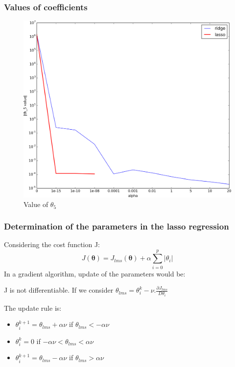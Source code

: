 \documentclass[handout, 10pt]{beamer}
\begin{document}
\begin{frame}
\frametitle{Values of coefficients}
\vspace{-2em}
\begin{table}
\resizebox{\textwidth}{!}{%
}
\end{table}
\begin{figure}
\includegraphics[height=0.4\textheight]{./coefs_th5_lasso.png}\\
Value of $\theta_5$
\end{figure}
\end{frame}

\begin{frame}
\frametitle{Determination of the parameters in the lasso regression}
Considering the cost function J:
$$
J(\bm{\theta}) =J_{lms}(\bm{\theta}) + \alpha \sum_{i=0}^p |\theta_i|
$$
In a gradient algorithm, update of the parameters would be:

J is not differentiable.
If we consider $\theta_{lms} = \theta_i^k -\nu.\frac{\partial J_{lms}}{D\theta_i} $

The update rule is:
\begin{itemize}
\item $\theta_i^{k+1} = \theta_{lms} + \alpha \nu$  if $\theta_{lms} < -\alpha \nu$
\item $\theta_i^k = 0$ if $-\alpha \nu < \theta_{lms} < \alpha \nu$
\item $\theta_i^{k+1} = \theta_{lms} - \alpha \nu$  if $\theta_{lms} > \alpha \nu$
\end{itemize}
\end{frame}
\end{document}
